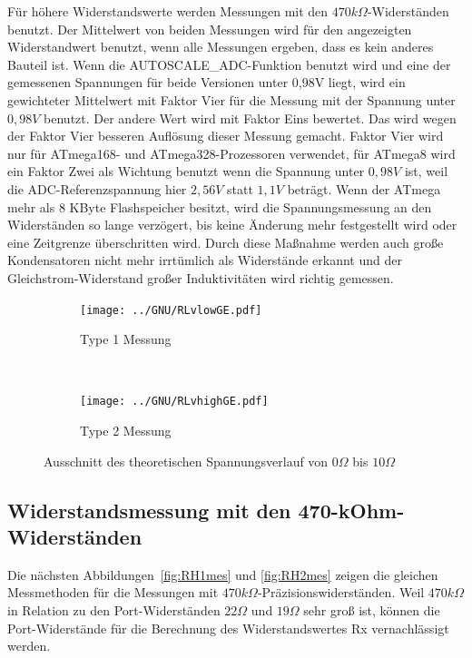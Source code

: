 Für höhere Widerstandswerte werden Messungen mit den \(470k\Omega\)-Widerständen benutzt.
Der Mittelwert von beiden Messungen wird für den angezeigten Widerstandwert benutzt, wenn alle Messungen ergeben,
dass es kein anderes Bauteil ist.
Wenn die AUTOSCALE\_ADC-Funktion benutzt wird und eine der gemessenen Spannungen für beide Versionen unter 0,98V liegt,
wird ein gewichteter Mittelwert mit Faktor Vier für die Messung mit der Spannung unter \(0,98V\) benutzt. Der andere Wert wird mit Faktor Eins bewertet.
Das wird wegen der Faktor Vier besseren Auflösung dieser Messung gemacht.
Faktor Vier wird nur für ATmega168- und ATmega328-Prozessoren verwendet, für ATmega8 wird ein
Faktor Zwei als Wichtung benutzt wenn die Spannung unter \(0,98V\) ist, weil die ADC-Referenzspannung hier \(2,56V\) statt \(1,1V\) beträgt.
Wenn der ATmega mehr als 8 KByte Flashspeicher besitzt, wird die Spannungsmessung an den Widerständen so lange verzögert,
bis keine Änderung mehr festgestellt wird oder eine Zeitgrenze überschritten wird.
Durch diese Maßnahme werden auch große Kondensatoren nicht mehr irrtümlich als
Widerstände erkannt und der Gleichstrom-Widerstand großer Induktivitäten wird richtig gemessen.

\begin{figure}[H]
  \begin{subfigure}[b]{.5\textwidth}
    \centering
    \texttt{[image: ../GNU/RLvlowGE.pdf]}
    \caption{Type 1 Messung}
    \label{fig:RLvlow}
  \end{subfigure}
  ~
  \begin{subfigure}[b]{.5\textwidth}
    \centering
    \texttt{[image: ../GNU/RLvhighGE.pdf]}
    \caption{Type 2 Messung}
    \label{fig:RLvhigh}
  \end{subfigure}
  \caption{Ausschnitt des theoretischen Spannungsverlauf von \(0\Omega\) bis \(10\Omega\)}
\end{figure}


\subsection{Widerstandsmessung mit den 470-kOhm-Widerständen}
Die nächsten Abbildungen~\ref{fig:RH1mes} und \ref{fig:RH2mes} zeigen die gleichen Messmethoden für die Messungen mit
 \(470k\Omega\)-Präzisionswiderständen.
Weil \(470k\Omega\) in Relation zu den Port-Widerständen \(22\Omega\) und \(19\Omega\) sehr groß ist,
können die Port-Widerstände für die Berechnung des Widerstandswertes Rx vernachlässigt werden.

